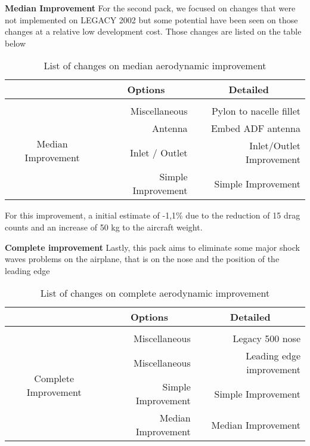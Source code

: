 \textbf{Median Improvement}
For the second pack, we focused on changes that were not implemented on LEGACY 2002 but some potential have been seen on those changes at a relative low development cost. Those changes are listed on the table below

\begin{table}[htbp]
  \centering
  \caption{List of changes on median aerodynamic improvement}
    \begin{tabular}{crr}
    \toprule
    \multirow{2}[2]{*}{} & \multicolumn{1}{c}{\multirow{2}[2]{*}{Options}} & \multicolumn{1}{c}{\multirow{2}[2]{*}{Detailed}} \\
    \midrule
          & \multicolumn{1}{c}{} & \multicolumn{1}{c}{} \\
    \multirow{4}[8]{*}{Median Improvement} & Miscellaneous & Pylon to nacelle fillet \\
          & Antenna & Embed ADF antenna \\
          & Inlet / Outlet & Inlet/Outlet Improvement \\
          & Simple Improvement & Simple Improvement \\
    \bottomrule
    \end{tabular}%
  \label{tab:changesmedian}%
\end{table}%

For this improvement, a initial estimate of -1,1\% due to the reduction of 15 drag counts and an increase of 50 kg to the aircraft weight.



\textbf{Complete improvement}
Lastly, this pack aims to eliminate some major shock waves problems on the airplane, that is on the nose and the position of the leading edge

\begin{table}[htbp]
  \centering
  \caption{List of changes on complete aerodynamic improvement}
    \begin{tabular}{crr}
    \toprule
    \multirow{2}[2]{*}{} & \multicolumn{1}{c}{\multirow{2}[2]{*}{Options}} & \multicolumn{1}{c}{\multirow{2}[2]{*}{Detailed}} \\
    \midrule
          & \multicolumn{1}{c}{} & \multicolumn{1}{c}{} \\
    \multirow{4}[8]{*}{Complete Improvement} & Miscellaneous & Legacy 500 nose \\
          & Miscellaneous & Leading edge improvement \\
          & Simple Improvement & Simple Improvement \\
          & Median Improvement & Median Improvement \\
    \bottomrule
    \end{tabular}%
  \label{tab:changescomplete}%
\end{table}%

